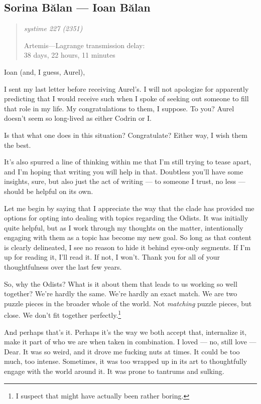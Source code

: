 \hypertarget{sorina-bux103lan-ioan-bux103lan}{%
\subsection{Sorina Bălan — Ioan Bălan}\label{sorina-bux103lan-ioan-bux103lan}}

\begin{quote}
\itshape
systime 227 (2351)

Artemis---Lagrange transmission delay:\\
38 days, 22 hours, 11 minutes
\end{quote}

Ioan (and, I guess, Aurel),

I sent my last letter before receiving Aurel's. I will not apologize for apparently predicting that I would receive such when I spoke of seeking out someone to fill that role in my life. My congratulations to them, I suppose. To you? Aurel doesn't seem so long-lived as either Codrin or I.

Is that what one does in this situation? Congratulate? Either way, I wish them the best.

It's also spurred a line of thinking within me that I'm still trying to tease apart, and I'm hoping that writing you will help in that. Doubtless you'll have some insights, sure, but also just the act of writing — to someone I trust, no less — should be helpful on its own.

Let me begin by saying that I appreciate the way that the clade has provided me options for opting into dealing with topics regarding the Odists. It was initially quite helpful, but as I work through my thoughts on the matter, intentionally engaging with them as a topic has become my new goal. So long as that content is clearly delineated, I see no reason to hide it behind eyes-only segments. If I'm up for reading it, I'll read it. If not, I won't. Thank you for all of your thoughtfulness over the last few years.

So, why the Odists? What is it about them that leads to us working so well together? We're hardly the same. We're hardly an exact match. We are two puzzle pieces in the broader whole of the world. Not \emph{matching} puzzle pieces, but close. We don't fit together perfectly.\footnote{I suspect that might have actually been rather boring.}

And perhaps that's it. Perhaps it's the way we both accept that, internalize it, make it part of who we are when taken in combination. I loved — no, still love — Dear. It was so weird, and it drove me fucking nuts at times. It could be too much, too intense. Sometimes, it was too wrapped up in its art to thoughtfully engage with the world around it. It was prone to tantrums and sulking.

